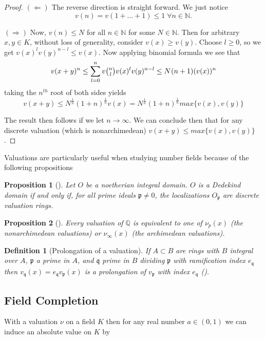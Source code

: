 \documentclass[paper=a4, fontsize=11pt]{scrartcl} %
\numberwithin{equation}{section} %
\numberwithin{figure}{section} %
\numberwithin{table}{section} %
\theoremstyle{break}
\newtheorem{defn}{Definition}
\newtheorem{prop}{Proposition}
\begin{document}
\begin{proof}
$(\Leftarrow)$ The reverse direction is straight forward. We just notice 
$$v(n)=v(1+\ldots+1) \leq 1\; \forall n\in\mathbb{N}.$$

$(\Rightarrow)$ Now, $v(n) \leq N$ for all $n\in\mathbb{N}$ for some $N \in \mathbb{N}$. Then for arbitrary $x,y\in K$, without loss of generality, consider $v(x) \geq v(y)$. Choose $l \geq 0$, so we get $v(x)^{l}v(y)^{n-l} \leq v(x)$. Now applying binomial formula we see that
$$
	v(x+y)^{n} \leq \sum_{l=0}^{n} v\tbinom{n}{l} v(x)^l v(y)^{n-l} \leq N^{}(n+1)(v(x))^n
$$
taking the $n^{th}$ root of both sides yields
$$
v(x+y) \leq N^{\frac{1}{n}}(1+n)^{\frac{1}{n}} v(x) = N^{\frac{1}{n}}(1+n)^{\frac{1}{n}} max\{v(x), v(y) \}
$$

The result then follows if we let $n \to \infty$. We can conclude then that for any discrete valuation (which is nonarchimedean) $v(x+y) \leq max \{v(x),v(y) \}$.
\end{proof}

Valuations are particularly useful when studying number fields because of the following propositions
\begin{prop}[\cite{Neukirch}]
Let $O$ be a noetherian integral domain. $O$ is a Dedekind domain if and only if, for all prime ideals $\mathfrak{p} \not= 0$, the localizations $O_\mathfrak{p}$ are discrete valuation rings.
\end{prop}
\begin{prop}[\cite{Neukirch}]
Every valuation of $\mathbb{Q}$ is equivalent to one of $\nu_p(x)$ (the nonarchimedean valuations) or $\nu_\infty(x)$ (the archimedean valuations).
\end{prop}

\begin{defn}[Prolongation of a valuation]
If $A \subset B$ are rings with $B$ integral over $A$, $\mathfrak{p}$ a prime in $A$, and $\mathfrak{q}$ prime in $B$ dividing $\mathfrak{p}$ with ramification index $e_\mathfrak{q}$ then $v_\mathfrak{q}(x)=e_\mathfrak{q}v_\mathfrak{p}(x)$ is a prolongation of $v_\mathfrak{p}$ with index $e_\mathfrak{q}$ (\cite{Serre}).
\end{defn}

\subsection{Field Completion}
With a valuation $\nu$ on a field $K$ then for any real number $a\in(0,1)$ we can induce an absolute value on $K$ by
\end{document}
